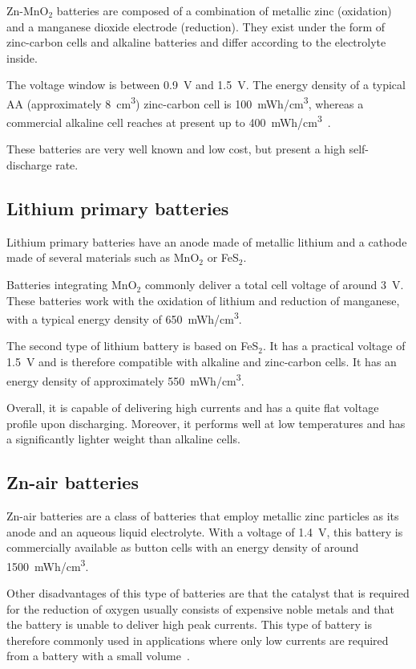 \documentclass{EPL-master-thesis-covers-EN}
\begin{document}
Zn-MnO${}_2$ batteries are composed of a combination of metallic zinc (oxidation) and a manganese dioxide electrode (reduction). They exist under the form of zinc-carbon cells and alkaline batteries and differ according to the electrolyte inside.

The voltage window is between \SI{0.9}{V} and \SI{1.5}{V}. The energy density of a typical AA (approximately \SI{8}{cm^3}) zinc-carbon cell is \SI{100}{mWh/cm^3}, whereas a commercial alkaline cell reaches at present up to \SI{400}{mWh/cm^3}~\cite{doi:10.1002/er.2949}.

These batteries are very well known and low cost, but present a high self-discharge rate.

\subsection*{Lithium primary batteries}

Lithium primary batteries have an anode made of metallic lithium and a cathode made of several materials such as MnO${}_2$ or FeS${}_2$.

Batteries integrating MnO${}_2$ commonly deliver a total cell voltage of around \SI{3}{V}. These batteries work with the oxidation of lithium and reduction of manganese, with a typical energy density of \SI{650}{mWh/cm^3}.

The second type of lithium battery is based on FeS${}_2$. It has a practical voltage of \SI{1.5}{V} and is therefore compatible with alkaline and zinc-carbon cells. It has an energy density of approximately \SI{550}{mWh/cm^3}.

Overall, it is capable of delivering high currents and has a quite flat voltage profile upon discharging. Moreover, it performs well at low temperatures and has a significantly lighter weight than alkaline cells.

\subsection*{Zn-air batteries}

Zn-air batteries are a class of batteries that employ metallic zinc particles as its anode and an aqueous liquid electrolyte. With a voltage of \SI{1.4}{V}, this
battery is commercially available as button cells with an energy density of around \SI{1500}{mWh/cm^3}.

Other disadvantages of this type of batteries are that the catalyst that is required for the reduction of oxygen usually consists of expensive noble metals and that the battery is unable to deliver high peak currents. This type of battery is therefore commonly used in applications where only low
currents are required from a battery with a small volume~\cite{doi:10.1002/er.2949}.
\end{document}
